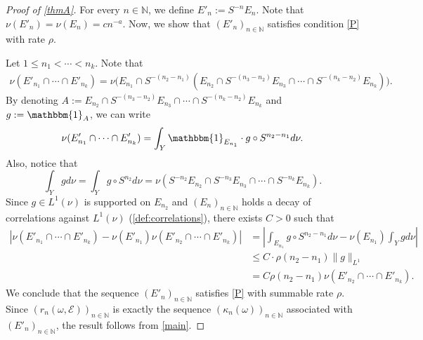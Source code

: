\documentclass[11pt]{amsart}
\numberwithin{equation}{section}
\theoremstyle{definition}
\theoremstyle{plain}
\newcommand{\N}{{\mathbb N}}
\begin{document}
\begin{proof}[Proof of \cref{thmA}]
    For every $n\in \N$, we define $E'_n:=S^{-n}E_n$. Note that $\nu(E'_n)=\nu(E_n)=cn^{-a}$. Now, we show that $(E'_n)_{n\in\N}$ satisfies condition \eqref{P} with rate $\rho$. 
    
    Let $1\leq n_1<\cdots<n_k$. Note that
    \begin{equation*}
    \begin{split}
             \nu(E'_{n_1}\cap \cdots\cap E'_{n_k})=\nu\Big(E_{n_1}\cap S^{-(n_2-n_1)}(E_{n_2}\cap S^{-(n_3-n_2)}E_{n_3}\cap\cdots\cap S^{-(n_k-n_2)}E_{n_k})\Big).
    \end{split}
    \end{equation*}
    By denoting $A:=E_{n_2}\cap S^{-(n_3-n_2)}E_{n_3}\cap\cdots\cap S^{-(n_k-n_2)}E_{n_k}$ and $g:=\mathbbm{1}_{A
    }$, we can write
    \begin{equation}
        \nu(E'_{n_1}\cap \cdots\cap E'_{n_k})=\int_Y \mathbbm{1}_{E_{n_1}}\cdot g\circ S^{n_2-n_1}d\nu.\label{eqn:cor_1}
    \end{equation}
    Also, notice that \[\int_Y gd\nu=\int_Y g\circ S^{n_2}d\nu=\nu(S^{-n_2}E_{n_2}\cap S^{-n_3}E_{n_3}\cap\cdots\cap S^{-n_k}E_{n_k}).\]
    Since $g\in L^1(\nu)$ is supported on $E_{n_2}$ and $(E_n)_{n\in\N}$ holds a decay of correlations against $L^1(\nu)$ (\cref{def:correlations}), there exists $C>0$ such that
    \begin{equation}
    \begin{split}
    \left| \nu(E'_{n_1}\cap \cdots\cap E'_{n_k})- \nu(E'_{n_1})\nu(E'_{n_2}\cap \cdots\cap E'_{n_k})\right|&=
           \left|\int_{E_{n_1}} g\circ S^{n_2-n_1}d\nu-\nu(E_{n_1})\int_{Y}gd\nu\right|\\
           &\leq C\cdot \rho(n_2-n_1)\|g\|_{L^1}\\
        &=C\rho(n_2-n_1)\nu(E'_{n_2}\cap\cdots\cap E'_{n_k}).
    \end{split}
     \label{eqn:cor_2}
    \end{equation}
    We conclude that the sequence $(E'_n)_{n\in\N}$ satisfies \eqref{P} with summable rate $\rho$. 
    Since $(r_{n}(\omega,\mathcal{E}))_{n\in\N}$ is exactly the sequence $(\kappa_n(\omega))_{n\in\N}$ associated with $(E'_n)_{n\in\N}$, the result follows from  \cref{main}. 
\end{proof}
\end{document}
